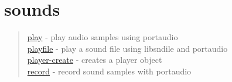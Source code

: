 \chapter*{sounds}

\begin{quote}
\noindent
\hyperlink{play}{play} - {play audio samples using portaudio} \\
\hyperlink{playfile}{playfile} - {play a sound file using libsndile and portaudio}\\
\hyperlink{player_create}{player-create} - {creates a player object} \\
\hyperlink{record}{record} - {record sound samples with portaudio} \\
\end{quote}





